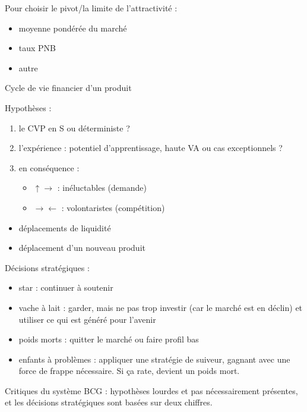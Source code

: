 	Pour choisir le pivot/la limite de l'attractivité :
	
	\begin{itemize}
		\item moyenne pondérée du marché
		\item taux PNB
		\item autre
	\end{itemize}
		
	Cycle de vie financier d'un produit
		
		
	

	Hypothèses :
	\begin{enumerate}
		\item le CVP en S ou déterministe ?
		\item l'expérience : potentiel d'apprentissage, haute VA ou cas exceptionnels ?
		\item en conséquence :
		
		\begin{itemize}
			\item $\uparrow\rightarrow$ : inéluctables (demande)
			\item $\rightarrow\leftarrow$ : volontaristes (compétition)
		\end{itemize}
	\end{enumerate}
	\n
	\begin{itemize}
		\item {\color{red} déplacements de liquidité}
		\item {\color{green} déplacement d'un nouveau produit}
	\end{itemize}
	\n
	Décisions stratégiques :
	
	\begin{itemize}
		\item star : continuer à soutenir
		\item vache à lait : garder, mais ne pas trop investir (car le marché est en déclin) et utiliser ce qui est généré pour l'avenir
		\item poids morts : quitter le marché ou faire profil bas
		\item enfants à problèmes : appliquer une stratégie de suiveur, gagnant avec une force de frappe nécessaire. Si ça rate, devient un poids mort.
	\end{itemize}
	\n
	
		Critiques du système BCG : hypothèses lourdes et pas nécessairement présentes, et les décisions stratégiques sont basées sur deux chiffres. \\
	
